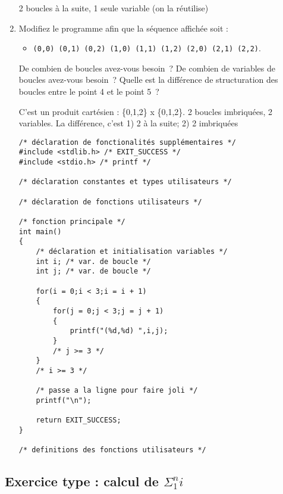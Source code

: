 \begin{enumerate}
  \begin{correction}
    2 boucles à la suite, 1 seule variable (on la réutilise)
  \end{correction}

\item Modifiez le programme afin que la séquence affichée soit :
  \begin{itemize}
  \item \verb|(0,0) (0,1) (0,2) (1,0) (1,1) (1,2) (2,0) (2,1) (2,2)|.
  \end{itemize}
  
  De combien de boucles avez-vous besoin~? De combien de variables de
  boucles avez-vous besoin~? Quelle est la différence de structuration
  des boucles entre le point 4 et le point 5~?

  \begin{correction}
    C'est un produit cartésien : \{0,1,2\} x \{0,1,2\}. 2 boucles
    imbriquées, 2 variables. La différence, c'est 1) 2 à la suite; 2)
    2 imbriquées 

\begin{verbatim}
/* déclaration de fonctionalités supplémentaires */
#include <stdlib.h> /* EXIT_SUCCESS */
#include <stdio.h> /* printf */

/* déclaration constantes et types utilisateurs */

/* déclaration de fonctions utilisateurs */

/* fonction principale */
int main()
{
    /* déclaration et initialisation variables */
    int i; /* var. de boucle */
    int j; /* var. de boucle */

    for(i = 0;i < 3;i = i + 1)
    {
        for(j = 0;j < 3;j = j + 1)
        {
            printf("(%d,%d) ",i,j);
        }
        /* j >= 3 */
    }
    /* i >= 3 */

    /* passe a la ligne pour faire joli */
    printf("\n");

    return EXIT_SUCCESS;
}

/* definitions des fonctions utilisateurs */
\end{verbatim}
\end{correction}

\end{enumerate}

\subsection{Exercice type : calcul de $\Sigma_1^n i$}

